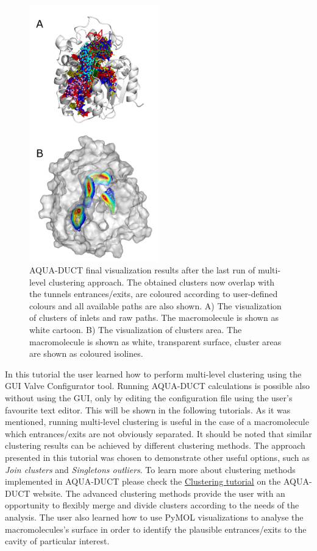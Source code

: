 \documentclass[9pt,tutorial]{livecoms}
\begin{document}
\begin{figure}[ht!]
\centering
\includegraphics[width=0.5\textwidth]{Tut2.4.png}
\caption{AQUA-DUCT final visualization results after the last run of multi-level clustering approach. The obtained clusters now overlap with the tunnels entrances/exits, are coloured according to user-defined colours and all available paths are also shown. A) The visualization of clusters of inlets and raw paths. The macromolecule is shown as white cartoon. B) The visualization of clusters area. The macromolecule is shown as white, transparent surface, cluster areas are shown as coloured isolines.}
\label{Tut2.4}
\end{figure}

In this tutorial the user learned how to perform multi-level clustering using the GUI Valve Configurator tool. Running AQUA-DUCT calculations is possible also without using the GUI, only by editing the configuration file using the user's favourite text editor. This will be shown in the following tutorials. As it was mentioned, running multi-level clustering is useful in the case of a macromolecule which entrances/exits are not obviously separated. It should be noted that similar clustering results can be achieved by different clustering methods. The approach presented in this tutorial was chosen to demonstrate other useful options, such as \textit{Join clusters} and \textit{Singletons outliers}. To learn more about clustering methods implemented in AQUA-DUCT please check the \href{http://www.aquaduct.pl/clustering/}{Clustering tutorial} on the AQUA-DUCT website. The advanced clustering methods provide the user with an opportunity to flexibly merge and divide clusters according to the needs of the analysis. The user also learned how to use PyMOL visualizations to analyse the macromolecules's surface in order to identify the plausible entrances/exits to the cavity of particular interest.
\end{document}
